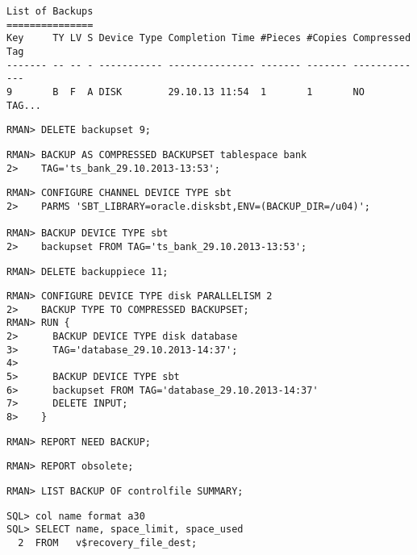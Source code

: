 \begin{enumerate}
\begin{lstlisting}[language=rman]
List of Backups
===============
Key     TY LV S Device Type Completion Time #Pieces #Copies Compressed Tag
------- -- -- - ----------- --------------- ------- ------- ---------- ---
9       B  F  A DISK        29.10.13 11:54  1       1       NO         TAG...

    \end{lstlisting}
    
    \begin{lstlisting}[language=rman]
RMAN> DELETE backupset 9;
    \end{lstlisting}
    
    \begin{lstlisting}[language=rman]
RMAN> BACKUP AS COMPRESSED BACKUPSET tablespace bank
2>    TAG='ts_bank_29.10.2013-13:53';
    \end{lstlisting}
\clearpage
    
    \begin{lstlisting}[language=rman]
RMAN> CONFIGURE CHANNEL DEVICE TYPE sbt
2>    PARMS 'SBT_LIBRARY=oracle.disksbt,ENV=(BACKUP_DIR=/u04)';

RMAN> BACKUP DEVICE TYPE sbt
2>    backupset FROM TAG='ts_bank_29.10.2013-13:53';
    \end{lstlisting}
    
    \begin{lstlisting}[language=rman]
RMAN> DELETE backuppiece 11;
    \end{lstlisting}
    
    \begin{lstlisting}[language=rman]
RMAN> CONFIGURE DEVICE TYPE disk PARALLELISM 2
2>    BACKUP TYPE TO COMPRESSED BACKUPSET;
RMAN> RUN {
2>      BACKUP DEVICE TYPE disk database
3>      TAG='database_29.10.2013-14:37';
4>
5>      BACKUP DEVICE TYPE sbt
6>      backupset FROM TAG='database_29.10.2013-14:37'
7>      DELETE INPUT;
8>    }
    \end{lstlisting}
    
    \begin{lstlisting}[language=rman]
RMAN> REPORT NEED BACKUP;
    \end{lstlisting}
    
    \begin{lstlisting}[language=rman]
RMAN> REPORT obsolete;
    \end{lstlisting}
    
    \begin{lstlisting}[language=rman]
RMAN> LIST BACKUP OF controlfile SUMMARY;
    \end{lstlisting}
    
\clearpage
    \begin{lstlisting}[language=oracle_sql]
SQL> col name format a30
SQL> SELECT name, space_limit, space_used
  2  FROM   v$recovery_file_dest;


\end{lstlisting}
\end{enumerate}

